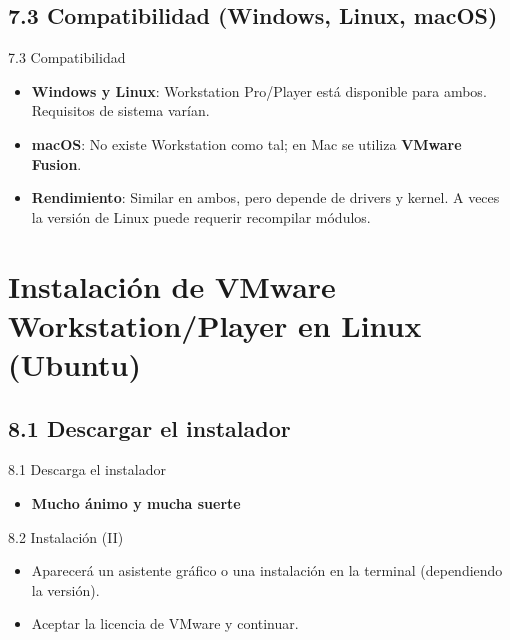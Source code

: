 \documentclass{beamer}
\begin{document}
\subsection{7.3 Compatibilidad (Windows, Linux, macOS)}
\begin{frame}{7.3 Compatibilidad}
	\begin{itemize}
		\item \textbf{Windows y Linux}: Workstation Pro/Player está disponible para ambos. Requisitos de sistema varían.
		\item \textbf{macOS}: No existe Workstation como tal; en Mac se utiliza \textbf{VMware Fusion}.  
		\item \textbf{Rendimiento}: Similar en ambos, pero depende de drivers y kernel. A veces la versión de Linux puede requerir recompilar módulos.
	\end{itemize}
\end{frame}

\section{Instalación de VMware Workstation/Player en Linux (Ubuntu)}

\subsection{8.1 Descargar el instalador}
\begin{frame}{8.1 Descarga el instalador}
	\begin{itemize}
		\item \textbf{Mucho ánimo y mucha suerte}
	\end{itemize}
\end{frame}


\begin{frame}{8.2 Instalación (II)}
	\begin{itemize}
		\item Aparecerá un asistente gráfico o una instalación en la terminal (dependiendo la versión).
		\item Aceptar la licencia de VMware y continuar.
	\end{itemize}
\end{frame}

\end{document}
